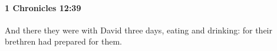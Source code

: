 
		\paragraph{1 Chronicles 12:39} %
			\label{1CHRONICLES-12-39}

			And there they were with David three days, eating and drinking: for their brethren had prepared for them.


